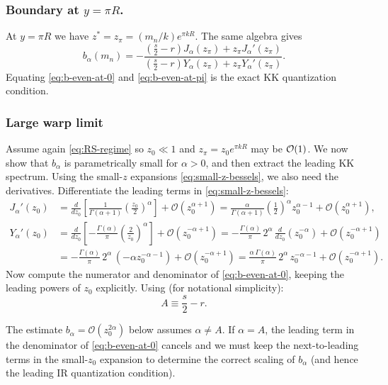 \documentclass[11pt]{article}
\begin{document}
\subsubsection*{Boundary at $y=\pi R$.}
At $y=\pi R$ we have $z^\ast=z_\pi=(m_n/k)e^{\pi kR}$. The same algebra gives
\begin{equation}
b_\alpha(m_n)
=-
\frac{\left(\frac{s}{2}-r\right)J_\alpha(z_\pi)+z_\pi J_\alpha'(z_\pi)}
{\left(\frac{s}{2}-r\right)Y_\alpha(z_\pi)+z_\pi Y_\alpha'(z_\pi)}.
\label{eq:b-even-at-pi}
\end{equation}
Equating \eqref{eq:b-even-at-0} and \eqref{eq:b-even-at-pi} is the exact KK quantization condition.
\subsubsection*{Large warp limit}
Assume again \eqref{eq:RS-regime} so $z_0\ll 1$ and $z_\pi=z_0 e^{\pi kR}$ may be ${\cal O}(1)$.
We now show that $b_\alpha$ is parametrically small for $\alpha>0$, and then extract the
leading KK spectrum. Using the small-$z$ expansions \eqref{eq:small-z-bessels}, we also need the derivatives.
Differentiate the leading terms in \eqref{eq:small-z-bessels}:
\begin{align}
J_\alpha'(z_0)
&=\frac{d}{dz_0}\left[\frac{1}{\Gamma(\alpha+1)}\left(\frac{z_0}{2}\right)^\alpha\right]
+ \mathcal{O}(z_0^{\alpha+1})
=
\frac{\alpha}{\Gamma(\alpha+1)}\left(\frac{1}{2}\right)^\alpha z_0^{\alpha-1}
+ \mathcal{O}(z_0^{\alpha+1}),
\label{eq:Jprime-small}
\\[4pt]
Y_\alpha'(z_0)
&=\frac{d}{dz_0}\left[-\frac{\Gamma(\alpha)}{\pi}\left(\frac{2}{z_0}\right)^\alpha\right]
+ \mathcal{O}(z_0^{-\alpha+1})
=
-\frac{\Gamma(\alpha)}{\pi}\,2^\alpha\,\frac{d}{dz_0}\left(z_0^{-\alpha}\right)
+ \mathcal{O}(z_0^{-\alpha+1})
\nonumber\\
&=
-\frac{\Gamma(\alpha)}{\pi}\,2^\alpha\,\left(-\alpha z_0^{-\alpha-1}\right)
+ \mathcal{O}(z_0^{-\alpha+1})
=
\frac{\alpha\,\Gamma(\alpha)}{\pi}\,2^\alpha\,z_0^{-\alpha-1}
+ \mathcal{O}(z_0^{-\alpha+1}).
\label{eq:Yprime-small}
\end{align}
Now compute the numerator and denominator of \eqref{eq:b-even-at-0}, keeping the leading
powers of $z_0$ explicitly. Using (for notational simplicity):
\begin{equation}
A \equiv \frac{s}{2}-r.
\label{eq:A-def}
\end{equation}
\begin{notationbox}
  The estimate $b_\alpha=\mathcal O(z_0^{2\alpha})$ below assumes $\alpha\neq A$. If $\alpha=A$,
  the leading term in the denominator of \eqref{eq:b-even-at-0} cancels and we must keep the
  next-to-leading terms in the small-$z_0$ expansion to determine the correct scaling of $b_\alpha$
  (and hence the leading IR quantization condition).
\end{notationbox}
\end{document}
